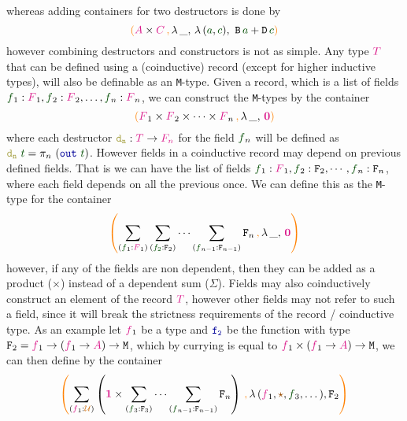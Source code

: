 \documentclass[twoside,11pt,openright]{report}
\theoremstyle{plain} %
\theoremstyle{definition}
\theoremstyle{remark}
\newcommand*{\term}[1]{\textcolor{green!30!black}{#1}} %
\newcommand*{\type}[1]{\textcolor{magenta!90!black}{#1}}
\newcommand*{\containerpair}[2]{\ensuremath{\colorlet{savedleftcolor}{.}\color{orange}\left(\color{savedleftcolor}#1\,\textcolor{orange}{\mathbf{,}}\,#2\color{orange}\right)\color{savedleftcolor}}}
\newcommand*{\containerpairsimple}[2]{\containerpair{#1}{\lambda\,\_,\,#2}}
\newcommand*{\universe}[1]{\textcolor{orange!80!black}{#1}}
\newcommand*{\unit}{\type{\textbf{1}}}
\newcommand*{\empt}{\type{\textbf{0}}}
\newcommand*{\constant}[1]{\textcolor{orange!60!black}{\ensuremath{\mathtt{#1}}}}
\newcommand*{\function}[1]{\textcolor{blue!60!black}{\ensuremath{\mathtt{#1}}}}
\newcommand*{\destructor}[1]{\textcolor{yellow!60!black}{\ensuremath{\mathtt{#1}}}}
\newcommand*{\typeformer}[1]{\ensuremath{\mathtt{#1}}}
\newcommand*{\unitelem}{\constant{\star}} %
\begin{document}
whereas adding containers for two destructors is done by 
\begin{equation}
  \containerpairsimple{\type{A} \times \type{C}}{\lambda\,(\term{a},\term{c}),~\typeformer{B}\,\term{a} + \typeformer{D}\,\term{c}}  
\end{equation}
however combining destructors and constructors is not as simple. Any type \(\type{T}\) that can be defined using a (coinductive) record (except for higher inductive types), will also be definable as an \texttt{M}-type. Given a record, which is a list of fields \(\term{f}_1 : \type{F}_1,\term{f}_2 : \type{F}_2,\dots,\term{f}_n : \type{F}_n\), we can construct the \texttt{M}-types by the container
\begin{equation}
  \containerpairsimple{\type{F}_1 \times \type{F}_2 \times \dots \times \type{F}_n}{\empt}
\end{equation}
where each destructor \(\destructor{d_n} : \type{T} \rightarrow \type{F_n}\) for the field \(\term{f}_n\) will be defined as \(\destructor{d_n}~\term{t} = \pi_n~(\function{out}~\term{t})\). However fields in a coinductive record may depend on previous defined fields. That is we can have the list of fields \(\term{f}_1 : \type{F}_1,\term{f}_2 : \typeformer{F}_2,\cdots,\term{f}_n : \typeformer{F}_n\), where each field depends on all the previous once. We can define this as the \texttt{M}-type for the container
\begin{equation}
  \containerpairsimple{\sum_{(\term{f}_1 : \type{F}_1)} \sum_{(\term{f_2} : \typeformer{F}_2)} \cdots \sum_{(\term{f}_{n-1} : \typeformer{F}_{n-1})}\typeformer{F}_n}{\empt}
\end{equation}
however, if any of the fields are non dependent, then they can be added as a product (\(\times\)) instead of a dependent sum (\(\Sigma\)). Fields may also coinductively construct an element of the record \(\type{T}\), however other fields may not refer to such a field, since it will break the strictness requirements of the record / coinductive type. As an example let \(\type{f}_1\) be a type and \(\function{f_2}\) be the function with type \(\typeformer{F}_2 = \type{f}_1 \rightarrow (\type{f}_1 \rightarrow \type{A}) \rightarrow \mathtt{M}\), which by currying is equal to \(\type{f}_1 \times (\type{f}_1 \rightarrow \type{A}) \rightarrow \mathtt{M}\), we can then define by the container
\begin{equation}
  \containerpair{\sum_{(\type{f}_1 : \universe{\mathcal{U}})} \left(\unit \times \sum_{(\term{f}_3 : \typeformer{F}_3)} \cdots \sum_{(\term{f}_{n-1} : \typeformer{F}_{n-1})}\typeformer{F}_n\right)}{\lambda\,(\type{f}_1,\unitelem,\term{f}_3,\dots),\typeformer{F}_2}
\end{equation}
\end{document}
